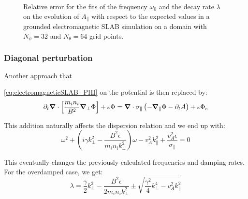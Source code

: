 \begin{figure}[H]
\begin{subfigure}[b]{0.45\textwidth}
		\label{fig:electromagneticSLAB_errorGrounded_kPerp_fixed}
	\end{subfigure}
	\caption{Relative error for the fits of the frequency $\omega_0$ and the decay rate $\lambda$ on the evolution of $A_\parallel$ with respect to the expected values in a grounded electromagnetic SLAB simulation on a domain with $N_\psi=32$ and $N_\theta=64$ grid points.}
	\label{fig:electromagneticSLAB_errorGrounded}
\end{figure}






\subsubsection{Diagonal perturbation}
Another approach that
 
\autoref{eq:electromagneticSLAB_PHI} on the potential is then replaced by:
\begin{equation*}
	\partial_t\grad\cdot\left[\frac{m_in_i}{B^2}\grad_\perp\Phi\right] + \varepsilon \Phi= \grad\cdot\sigma_\parallel\left(-\grad_\parallel\Phi-\partial_tA\right) + \varepsilon \Phi_e
\end{equation*}

This addition naturally affects the dispersion relation and we end up with:
\begin{equation*}
	\omega^2+\left(i\gamma k_\perp^2 - \frac{B^2\epsilon}{m_in_ik_\perp^2}\right)\omega-v_A^2k_\parallel^2+\frac{v_A^2 \epsilon}{\sigma_\parallel}=0
\end{equation*}

This eventually changes the previously calculated frequencies and damping rates. For the overdamped case, we get:
$$ \lambda = \frac{\gamma}{2}k_\perp^2 - \frac{B^2\epsilon}{2m_in_ik_\perp^2} \pm \sqrt{\frac{\gamma^2}{4}k_\perp^4-v_A^2k_\parallel^2}$$
